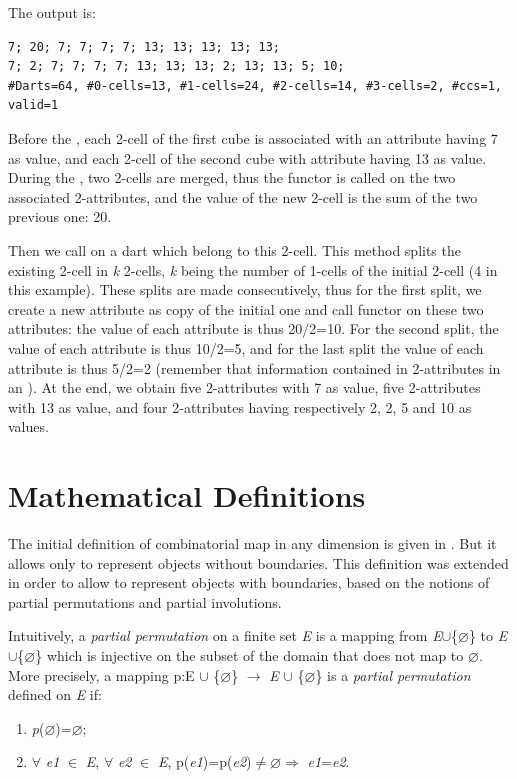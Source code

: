 
The output is:
\begin{verbatim}
7; 20; 7; 7; 7; 7; 13; 13; 13; 13; 13; 
7; 2; 7; 7; 7; 7; 13; 13; 13; 2; 13; 13; 5; 10; 
#Darts=64, #0-cells=13, #1-cells=24, #2-cells=14, #3-cells=2, #ccs=1, valid=1
\end{verbatim}

Before the , each 2-cell of the first cube is
associated with an attribute having 7 as value, and each 2-cell of the
second cube with attribute having 13 as value. During the
, two 2-cells are merged, thus the functor
 is called on the two associated 2-attributes, and
the value of the new 2-cell is the sum of the two previous one: 20.

Then we call  on a dart which
belong to this 2-cell. This method splits the existing 2-cell in \emph{k}
2-cells, \emph{k} being the number of 1-cells of the initial 2-cell (4 in
this example). These splits are made consecutively, thus for the first
split, we create a new attribute as copy of the initial one and call
functor  on these two attributes: the value
of each attribute is thus 20/2=10. For the second split, the value of
each attribute is thus 10/2=5, and for the last split the value of
each attribute is thus 5/2=2 (remember that information contained in
2-attributes in an ).  At the end, we obtain five
2-attributes with 7 as value, five 2-attributes with 13 as value, and
four 2-attributes having respectively 2, 2, 5 and 10 as values.

\section{Mathematical Definitions}\label{sec_definition}
The initial definition of combinatorial map in any dimension is given
in \cite{cgal:l-tmbrc-91,l-ndgcm-94}. But it allows only to represent
objects without boundaries. This definition was extended
\cite{cgal:pabl-cco-07,cgal:d-ccccg-10} in order to allow to represent 
objects with boundaries, based on the notions of partial permutations 
and partial involutions.

Intuitively, a \emph{partial permutation} on a finite set \emph{E} is a
mapping from \emph{E}$\cup$\{$\varnothing$\} to \emph{E}$\cup$\{$\varnothing$\} which is
injective on the subset of the domain that does not map to
$\varnothing$.  More precisely, a mapping p:E $\cup$ \{$\varnothing$\}
$\rightarrow$ \emph{E} $\cup$ \{$\varnothing$\} is a \emph{partial permutation}
defined on \emph{E} if:
\begin{enumerate}
\item \emph{p}($\varnothing$)=$\varnothing$;
\item $\forall$ \emph{e1} $\in$ \emph{E}, $\forall$ \emph{e2} $\in$ \emph{E},
  p(\emph{e1})=p(\emph{e2})$\neq \varnothing \Rightarrow$ \emph{e1}=\emph{e2}.
\end{enumerate}

